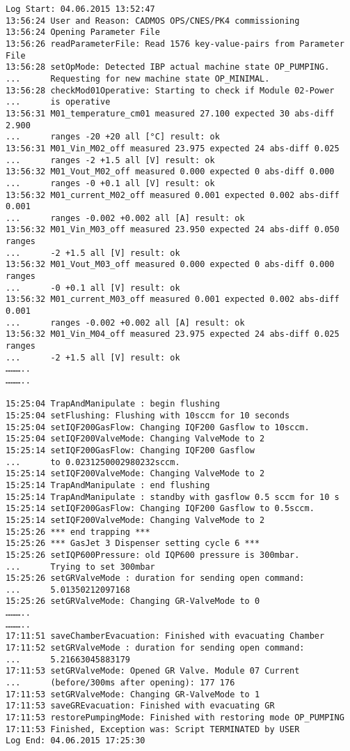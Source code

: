 \begin{small}
\begin{verbatim}
Log Start: 04.06.2015 13:52:47
13:56:24 User and Reason: CADMOS OPS/CNES/PK4 commissioning
13:56:24 Opening Parameter File
13:56:26 readParameterFile: Read 1576 key-value-pairs from Parameter File
13:56:28 setOpMode: Detected IBP actual machine state OP_PUMPING.
...      Requesting for new machine state OP_MINIMAL.
13:56:28 checkMod01Operative: Starting to check if Module 02-Power
...      is operative
13:56:31 M01_temperature_cm01 measured 27.100 expected 30 abs-diff 2.900
...      ranges -20 +20 all [°C] result: ok
13:56:31 M01_Vin_M02_off measured 23.975 expected 24 abs-diff 0.025
...      ranges -2 +1.5 all [V] result: ok
13:56:32 M01_Vout_M02_off measured 0.000 expected 0 abs-diff 0.000
...      ranges -0 +0.1 all [V] result: ok
13:56:32 M01_current_M02_off measured 0.001 expected 0.002 abs-diff 0.001
...      ranges -0.002 +0.002 all [A] result: ok
13:56:32 M01_Vin_M03_off measured 23.950 expected 24 abs-diff 0.050 ranges
...      -2 +1.5 all [V] result: ok
13:56:32 M01_Vout_M03_off measured 0.000 expected 0 abs-diff 0.000 ranges
...      -0 +0.1 all [V] result: ok
13:56:32 M01_current_M03_off measured 0.001 expected 0.002 abs-diff 0.001
...      ranges -0.002 +0.002 all [A] result: ok
13:56:32 M01_Vin_M04_off measured 23.975 expected 24 abs-diff 0.025 ranges
...      -2 +1.5 all [V] result: ok
………..
………..

15:25:04 TrapAndManipulate : begin flushing
15:25:04 setFlushing: Flushing with 10sccm for 10 seconds
15:25:04 setIQF200GasFlow: Changing IQF200 Gasflow to 10sccm.
15:25:04 setIQF200ValveMode: Changing ValveMode to 2
15:25:14 setIQF200GasFlow: Changing IQF200 Gasflow
...      to 0.0231250002980232sccm.
15:25:14 setIQF200ValveMode: Changing ValveMode to 2
15:25:14 TrapAndManipulate : end flushing
15:25:14 TrapAndManipulate : standby with gasflow 0.5 sccm for 10 s
15:25:14 setIQF200GasFlow: Changing IQF200 Gasflow to 0.5sccm.
15:25:14 setIQF200ValveMode: Changing ValveMode to 2
15:25:26 *** end trapping ***
15:25:26 *** GasJet 3 Dispenser setting cycle 6 ***
15:25:26 setIQP600Pressure: old IQP600 pressure is 300mbar.
...      Trying to set 300mbar
15:25:26 setGRValveMode : duration for sending open command:
...      5.01350212097168
15:25:26 setGRValveMode: Changing GR-ValveMode to 0
………..
………..
17:11:51 saveChamberEvacuation: Finished with evacuating Chamber
17:11:52 setGRValveMode : duration for sending open command:
...      5.21663045883179
17:11:53 setGRValveMode: Opened GR Valve. Module 07 Current
...      (before/300ms after opening): 177 176
17:11:53 setGRValveMode: Changing GR-ValveMode to 1
17:11:53 saveGREvacuation: Finished with evacuating GR
17:11:53 restorePumpingMode: Finished with restoring mode OP_PUMPING
17:11:53 Finished, Exception was: Script TERMINATED by USER
Log End: 04.06.2015 17:25:30
\end{verbatim}
\end{small}

